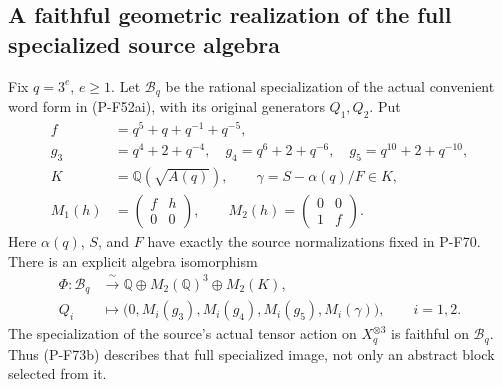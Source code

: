 \subsection{A faithful geometric realization of the full specialized source algebra}

\begin{proposition}
\label{prop:nonstandardfullcorrespondence}
Fix $q=3^e$, $e\ge1$.  Let $\mathcal B_q$ be the rational
specialization of the actual convenient word form
in (P-F52ai), with its original generators $Q_1,Q_2$.
Put
\[
 \begin{split}
 f&=q^5+q+q^{-1}+q^{-5},\\
 g_3&=q^4+2+q^{-4},\quad
 g_4=q^6+2+q^{-6},\quad
 g_5=q^{10}+2+q^{-10},\\
 K&=\mathbb Q(\sqrt{A(q)}),\qquad
 \gamma=S-\alpha(q)/F\in K,\\
 M_1(h)&=\begin{pmatrix}f&h\\0&0\end{pmatrix},\qquad
 M_2(h)=\begin{pmatrix}0&0\\1&f\end{pmatrix}.
 \end{split}                                                   \tag{P-F73a}
\]
Here $\alpha(q)$, $S$, and $F$ have exactly the source
normalizations fixed in P-F70.  There is an explicit
algebra isomorphism
\[
 \begin{split}
 \Phi:\mathcal B_q&\xrightarrow{\ \sim\ }
       \mathbb Q\oplus M_2(\mathbb Q)^3\oplus M_2(K),\\
 Q_i&\longmapsto
       \bigl(0,M_i(g_3),M_i(g_4),M_i(g_5),M_i(\gamma)\bigr),
                    \qquad i=1,2.
 \end{split}                                                   \tag{P-F73b}
\]
The specialization of the source's actual tensor action
on $X_q^{\otimes3}$ is faithful on $\mathcal B_q$.
Thus (P-F73b) describes that full specialized image,
not only an abstract block selected from it.


\end{proposition}
